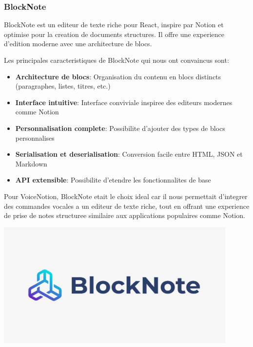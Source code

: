 \subsubsection{BlockNote}
\begin{minipage}{0.7\textwidth}
BlockNote est un editeur de texte riche pour React, inspire par Notion et optimise pour la creation de documents structures. Il offre une experience d'edition moderne avec une architecture de blocs.

Les principales caracteristiques de BlockNote qui nous ont convaincus sont:

\begin{itemize}
    \item \textbf{Architecture de blocs}: Organisation du contenu en blocs distincts (paragraphes, listes, titres, etc.)
    \item \textbf{Interface intuitive}: Interface conviviale inspiree des editeurs modernes comme Notion
    \item \textbf{Personnalisation complete}: Possibilite d'ajouter des types de blocs personnalises
    \item \textbf{Serialisation et deserialisation}: Conversion facile entre HTML, JSON et Markdown
    \item \textbf{API extensible}: Possibilite d'etendre les fonctionnalites de base
\end{itemize}

Pour VoiceNotion, BlockNote etait le choix ideal car il nous permettait d'integrer des commandes vocales a un editeur de texte riche, tout en offrant une experience de prise de notes structuree similaire aux applications populaires comme Notion.
\end{minipage}%
\hfill
\begin{minipage}{0.25\textwidth}
\centering
\includegraphics[width=0.9\textwidth]{assets/docs/blocknote.png}
\end{minipage}

